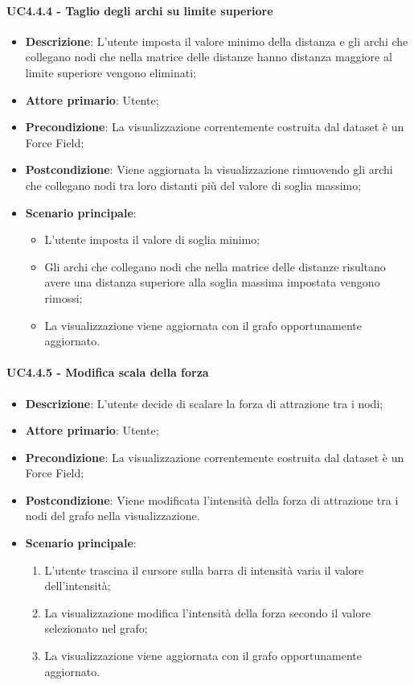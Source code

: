 \paragraph{UC4.4.4 - Taglio degli archi su limite superiore}
\label{par:uc4.4.4}
\begin{itemize}
    \item \textbf{Descrizione}:     L'utente imposta il valore minimo della distanza e gli archi che collegano nodi che nella matrice delle distanze hanno distanza maggiore al limite superiore vengono eliminati;
    \item \textbf{Attore primario}: Utente;
    \item \textbf{Precondizione}:   La visualizzazione correntemente costruita dal dataset è un Force Field;
    \item \textbf{Postcondizione}:  Viene aggiornata la visualizzazione rimuovendo gli archi  che collegano nodi tra loro distanti più del valore di soglia massimo;
    \item \textbf{Scenario principale}:
    \begin{itemize}
        \item L'utente imposta il valore di soglia minimo;
        \item Gli archi che collegano nodi che nella matrice delle distanze risultano avere una distanza superiore alla soglia massima impostata vengono rimossi;
        \item La visualizzazione viene aggiornata con il grafo opportunamente aggiornato.
    \end{itemize}
\end{itemize}

\paragraph{UC4.4.5 - Modifica scala della forza}
\label{par:uc4.4.5}
\begin{itemize}
    \item \textbf{Descrizione}: L’utente decide di scalare la forza di attrazione tra i nodi;


    \item \textbf{Attore primario}: Utente;

    \item \textbf{Precondizione}:   La visualizzazione correntemente costruita dal dataset è un Force Field;
    \item \textbf{Postcondizione}:  Viene modificata l'intensità della forza di attrazione tra i nodi del grafo nella visualizzazione.

	\item \textbf{Scenario principale}:
        \begin{enumerate}
            \item L'utente trascina il cursore sulla barra di intensità varia il valore dell’intensità;
            \item La visualizzazione modifica l'intensità della forza secondo il valore selezionato nel grafo;
            \item La visualizzazione viene aggiornata con il grafo opportunamente aggiornato.
        \end{enumerate}
\end{itemize}

